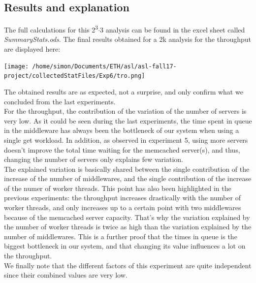 \documentclass[11pt,a4paper]{article}
\begin{document}
\subsection{Results and explanation}
The full calculations for this 2\textsuperscript{3}\(\cdot\)3 analysis can be found in the excel sheet called \textit{SummaryStats.ods}. The final results obtained for a 2k analysis for the throughput are displayed here:
\begin{center} 
\texttt{[image: /home/simon/Documents/ETH/asl/asl-fall17-project/collectedStatFiles/Exp6/tro.png]}
\end{center}
The obtained results are as expected, not a surprise, and only confirm what we concluded from the last experiments.
\\
For the throughput, the contribution of the variation of the number of servers is very low. As it could be seen during the last experiments, the time spent in queue in the middleware has always been the bottleneck of our system when using a single get workload. In addition, as observed in experiment 5, using more servers doesn't improve the total time waiting for the memcached server(s), and thus, changing the number of servers only explains few variation. 
\\
The explained variation is basically shared between the single contribution of the increase of the number of middlewares, and the single contribution of the increase of the numer of worker threads. This point has also been highlighted in the previous experiments: the throughput increases drastically with the number of worker threads, and only increases up to a certain point with two middlewares because of the memcached server capacity. That's why the variation explained by the number of worker threads is twice as high than the variation explained by the number of middlewares. This is a further proof that the times in queue is the biggest bottleneck in our system, and that changing its value influences a lot on the throughput. 
\\We finally note that the different factors of this experiment are quite independent since their combined values are very low. 
\newpage
\end{document}
